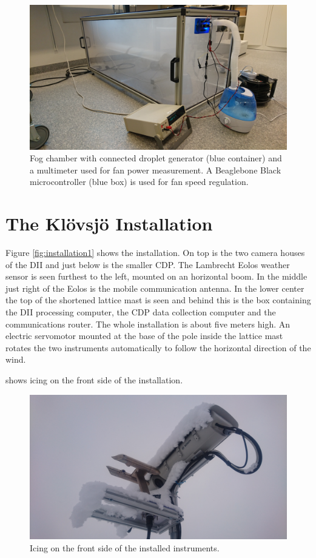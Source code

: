 \begin{figure}[ht]
\centering\includegraphics[width=0.75\linewidth]{figures/DSC_0103}
\caption{Fog chamber with connected droplet generator (blue container) and a multimeter used for fan power measurement. A Beaglebone Black microcontroller (blue box) is used for fan speed regulation.}
\end{figure}

\section{The Klövsjö Installation}
Figure \ref{fig:installation1} shows the installation. On top is the two camera houses of the DII and just below is the smaller CDP. The Lambrecht Eolos weather sensor is seen furthest to the left, mounted on an horizontal boom. In the middle just right of the Eolos is the mobile communication antenna. In the lower center the top of the shortened lattice mast is seen and behind this is the box containing the DII processing computer, the CDP data collection computer and the communications router. The whole installation is about five meters high. An electric servomotor mounted at the base of the pole inside the lattice mast rotates the two instruments automatically to follow the horizontal direction of the wind. 

 shows icing on the front side of the installation.

\begin{figure}[ht]
\centering\includegraphics[width=0.75\linewidth]{figures/installation3}
\caption{Icing on the front side of the installed instruments.}
\label{fig:installation3}
\end{figure}

